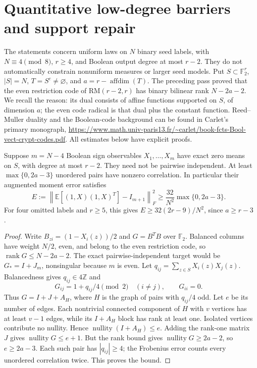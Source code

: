 \section{Quantitative low-degree barriers and support repair}
\label{s23:sec:nonlinear-quantitative}
The statements concern uniform laws on $N$ binary seed labels, with
$N\equiv4\pmod8$, $r\ge4$, and Boolean output degree at most $r-2$.
They do not automatically constrain nonuniform measures or larger seed
models. Put $S\subset\mathbb F_2^r$, $|S|=N$, $T=S^c\ne\varnothing$,
and $a=r-\operatorname{affdim}(T)$. The preceding pass proved that the
even restriction code of $\mathrm{RM}(r-2,r)$ has binary bilinear rank
$N-2a-2$. We recall the reason: its dual consists of affine functions
supported on $S$, of dimension $a$; the even code radical is that dual
plus the constant function. Reed--Muller duality and the Boolean-code
background can be found in Carlet's primary monograph,
\url{https://www.math.univ-paris13.fr/~carlet/book-fcts-Bool-vect-crypt-codes.pdf}.
All estimates below have explicit proofs.

\begin{theorem}
\label{s23:thm:nonlinear-moment-floor}
Suppose $m=N-4$ Boolean sign observables $X_1,\ldots,X_m$ have exact
zero means on $S$, with degree at most $r-2$. They need not be pairwise
independent. At least $\max\{0,2a-3\}$ unordered pairs have nonzero
correlation. In particular their augmented moment error satisfies
\[
 E:=\left\|\mathbb E[(1,X)(1,X)^T]-I_{m+1}\right\|_F^2
 \ge\frac{32}{N^2}\max\{0,2a-3\}.
\]
For four omitted labels and $r\ge5$, this gives
$E\ge32(2r-9)/N^2$, since $a\ge r-3$.
\end{theorem}
\begin{proof}
Write $B_{zi}=(1-X_i(z))/2$ and $G=B^TB$ over $\mathbb F_2$.
Balanced columns have weight $N/2$, even, and belong to the even
restriction code, so $\operatorname{rank}G\le N-2a-2$.
The exact pairwise-independent target would be $G_*=I+J_m$,
nonsingular because $m$ is even. Let $q_{ij}=\sum_{z\in S}X_i(z)X_j(z)$.
Balancedness gives $q_{ij}\in4\mathbb Z$ and
\[
 G_{ij}=1+q_{ij}/4\pmod2\quad(i\ne j),\qquad G_{ii}=0.
\]
Thus $G=I+J+A_H$, where $H$ is the graph of pairs with $q_{ij}/4$ odd.
Let $e$ be its number of edges. Each nontrivial connected component of
$H$ with $v$ vertices has at least $v-1$ edges, while its $I+A_H$ block
has rank at least one. Isolated vertices contribute no nullity. Hence
$\operatorname{nullity}(I+A_H)\le e$. Adding the rank-one matrix $J$
gives $\operatorname{nullity}G\le e+1$.
But the rank bound gives $\operatorname{nullity}G\ge2a-2$, so
$e\ge2a-3$. Each such pair has $|q_{ij}|\ge4$; the Frobenius error
counts every unordered correlation twice. This proves the bound.
\end{proof}

